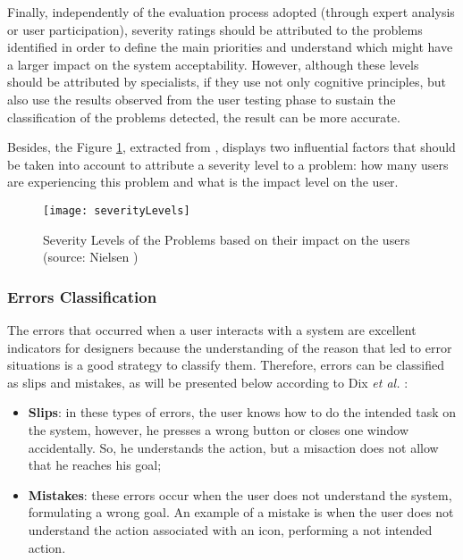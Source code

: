 \bigskip

Finally, independently of the evaluation process adopted (through expert analysis or user participation), severity ratings should be attributed to the problems identified in order to define the main priorities and understand which might have a larger impact on the system acceptability. However, although these levels should be attributed by specialists, if they use not only cognitive principles, but also use the results observed from the user testing phase to sustain the classification of the problems detected, the result can be more accurate. 

Besides, the Figure \ref{fig:severityLevels}, extracted from \cite{usabilityEngineering}, displays two influential factors that should be taken into account to attribute a severity level to a problem: how many users are experiencing this problem and what is the impact level on the user.

\begin{figure}[htbp]
	\centering
	\texttt{[image: severityLevels]}
	\caption{Severity Levels of the Problems based on their impact on the users (source: Nielsen \cite{usabilityEngineering})}
	\label{fig:severityLevels}
\end{figure}

\subsubsection{Errors Classification}
\label{subsubsec:errors_classification}
The errors that occurred when a user interacts with a system are excellent indicators for designers because the understanding of the reason that led to error situations is a good strategy to classify them. Therefore, errors can be classified as slips and mistakes, as will be presented below according to Dix \textit{et al.} \cite{humanComputerInteraction}:

\begin{itemize}
	\item \textbf{Slips}: in these types of errors, the user knows how to do the intended task on the system, however, he presses a wrong button or closes one window accidentally. So, he understands the action, but a misaction does not allow that he reaches his goal;
	\item \textbf{Mistakes}: these errors occur when the user does not understand the system, formulating a wrong goal. An example of a mistake is when the user does not understand the action associated with an icon, performing a not intended action.
\end{itemize}

